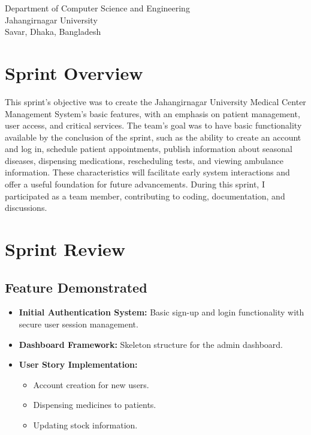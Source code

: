\documentclass[a4paper,12pt]{article}
\begin{document}
\begin{center}
\begin{table}[h!]
\begin{tabular}{|c|c|c|c|}
        \end{tabular}
    \end{table}

    \vspace{1cm}

    Department of Computer Science and Engineering\\
    Jahangirnagar University\\
    Savar, Dhaka, Bangladesh\\
\end{center}

\newpage

\tableofcontents

\newpage
\pagestyle{fancy}
\fancyhf{}
\fancyfoot[C]{\thepage} %
\section{Sprint Overview}
This sprint's objective was to create the Jahangirnagar University Medical Center Management System's basic
features, with an emphasis on patient management, user access, and critical services. The team's goal was to
have basic functionality available by the conclusion of the sprint, such as the ability to create an account
and log in, schedule patient appointments, publish information about seasonal diseases, dispensing
medications, rescheduling tests, and viewing ambulance information. These characteristics will facilitate
early system interactions and offer a useful foundation for future advancements. During this sprint, I participated as a team member, contributing to coding, documentation, and discussions.
\newpage
\section{Sprint Review}
\subsection{Feature Demonstrated}
\begin{itemize}
    \item \textbf{Initial Authentication System: }Basic sign-up and login functionality with secure user session management.
    \item \textbf{Dashboard Framework: }Skeleton structure for the admin dashboard.
    \item \textbf{User Story Implementation: }
        \begin{itemize}
            \item Account creation for new users.
            \item Dispensing medicines to patients.
            \item Updating stock information.
        \end{itemize}
\end{itemize}
\end{document}
